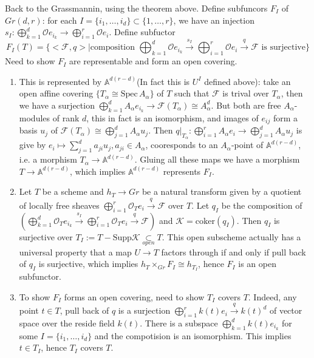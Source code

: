 \documentclass{article}
\newcommand{\Spec}{\mathrm{Spec}\,}
\begin{document}
Back to the Grassmannin, using the theorem above. Define subfuncors $ F_I $ of $ Gr(d,r) $: for each $ I=\{i_1,\ldots,i_d\}\subset \{1,\ldots,r\} $, we have an injection $ s_I:\bigoplus_{k=1}^d\mathcal{O}e_{i_k}\to\bigoplus_{i=1}^{r}\mathcal{O}e_i $. Define subfuctor
$$ F_I(T)=\{ <\mathcal{F},q>|\text{composition }\bigoplus_{k=1}^d\mathcal{O}e_{i_k}\xrightarrow{s_I}\bigoplus_{i=1}^{r}\mathcal{O}e_i\xrightarrow{q} \mathcal{F} \text{ is surjective} \} $$
Need to show $ F_I $ are representable and form an open covering. 
\begin{enumerate}
	\item This is  represented by $ \mathbb{A}^{d(r-d)} $(In fact this is $ U^I $ defined above): take an open affine covering $\{ T_\alpha \cong \Spec A_\alpha \} $ of $ T $ such that $ \mathcal{F} $ is trival over $ T_\alpha $, then we have a surjection $ \bigoplus_{k=1}^dA_\alpha e_{i_k}\to \mathcal{F}(T_\alpha)\cong A_\alpha^d $. But both are  free $ A_\alpha $-modules of rank $ d $, this in fact is an isomorphism, and images of $ e_{ij} $ form a basis $ u_j $ of $ \mathcal{F}(T_\alpha)\cong \bigoplus_{j=1}^d A_\alpha u_j $. Then  $ q|_{T_\alpha}:\bigoplus_{i=1}^{r} A_\alpha e_i \to \bigoplus_{j=1}^d A_\alpha u_j$ is give by $ e_i\mapsto \sum_{j=1}^d a_{ji}u_j,a_{ji}\in A_\alpha $, cooresponds to an $ A_\alpha $-point of $  \mathbb{A}^{d(r-d)} $, i.e. a morphism $ T_\alpha \to  \mathbb{A}^{d(r-d)} $. Gluing all these maps we have a morphism $ T\to  \mathbb{A}^{d(r-d) }$, which implies $ \mathbb{A}^{d(r-d)} $ represents $ F_I $. 
	\item Let $ T $ be a scheme and $ h_T\to Gr $ be a natural transform given by a quotient of locally free sheaves $ \bigoplus_{i=1}^{r}\mathcal{O}_Te_i\xrightarrow{q} \mathcal{F} $ over $ T $. Let $ q_I $ be the composition of $ (\bigoplus_{k=1}^d\mathcal{O}_Te_{i_k}\xrightarrow{s_I}\bigoplus_{i=1}^{r}\mathcal{O}_Te_i\xrightarrow{q} \mathcal{F}) $ and $ \mathcal{K}=\mathrm{coker}(q_I)  $. Then $ q_I $ is surjective over $ T_I:= T-\mathrm{Supp}\mathcal{K} \underset{open}{\subset} T$. This open subscheme actually has a universal property that a map $ U\to T $ factors through if and only if pull back of $ q_I $ is surjective, which implies $ h_T\times_{Gr}F_I\cong h_{T_I} $, hence $ F_I $ is an open subfunctor.
	\item To show $ F_I $ forms an open covering, need to show $ T_I $ covers $ T $. Indeed, any point $ t\in T $, pull back of $ q $ is a surjection $ \bigoplus_{i=1}^{r}k(t)e_i\xrightarrow{q} k(t)^d $ of vector space over the  reside field $ k(t) $. There is a subspace $ \bigoplus_{k=1}^d k(t)e_{i_k} $ for some $ I=\{i_1,\ldots,i_d\} $ and the  compotision is an isomorphism. This implies $ t\in T_I $, hence $ T_I $ covers $ T $.
\end{enumerate}
\end{document}
